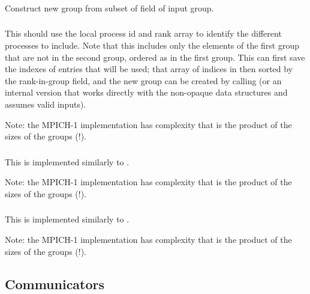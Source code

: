 \documentclass{article}
\begin{document}
\subsubsection{}
\begin{adi3}
  Construct new group from subset of  field of
  input group.
\end{adi3}

\subsubsection{}

This should use the local process id and rank array to identify the different
processes to include.  Note that this includes only the elements of the first
group that are not in the second group, ordered as in the first group.  
This can first save the indexes of entries that will be used; that array of
indices in then sorted by the rank-in-group field, and the new group can be
created by calling  (or an internal version that works
directly with the non-opaque data structures and assumes valid inputs).

Note: the MPICH-1 implementation has complexity that is the product of the
sizes of the groups (!).

\subsubsection{}

This is implemented similarly to .

Note: the MPICH-1 implementation has complexity that is the product of the
sizes of the groups (!).

\subsubsection{}

This is implemented similarly to .

Note: the MPICH-1 implementation has complexity that is the product of the
sizes of the groups (!).

\subsection{Communicators}
\end{document}

